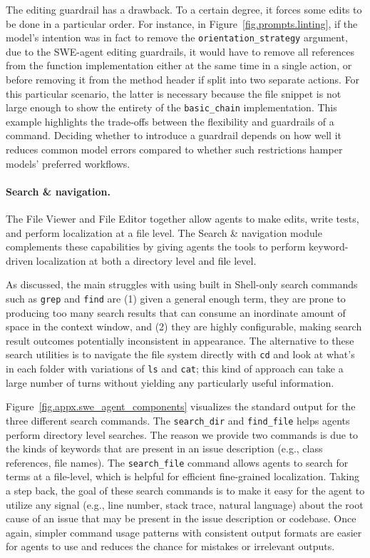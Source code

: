 The editing guardrail has a drawback.
To a certain degree, it forces some edits to be done in a particular order.
For instance, in Figure~\ref{fig.prompts.linting}, if the model's intention was in fact to remove the \texttt{orientation\_strategy} argument, due to the SWE-agent editing guardrails, it would have to remove all references from the function implementation either at the same time in a single action, or before removing it from the method header if split into two separate actions.
For this particular scenario, the latter is necessary because the file snippet is not large enough to show the entirety of the \texttt{basic\_chain} implementation.
This example highlights the trade-offs between the flexibility and guardrails of a command.
Deciding whether to introduce a guardrail depends on how well it reduces common model errors compared to whether such restrictions hamper models' preferred workflows.

\paragraph{Search \& navigation.}
The File Viewer and File Editor together allow agents to make edits, write tests, and perform localization at a file level.
The Search \& navigation module complements these capabilities by giving agents the tools to perform keyword-driven localization at both a directory level and file level.

As discussed, the main struggles with using built in Shell-only search commands such as \texttt{grep} and \texttt{find} are (1) given a general enough term, they are prone to producing too many search results that can consume an inordinate amount of space in the context window, and (2) they are highly configurable, making search result outcomes potentially inconsistent in appearance.
The alternative to these search utilities is to navigate the file system directly with \texttt{cd} and look at what's in each folder with variations of \texttt{ls} and \texttt{cat}; this kind of approach can take a large number of turns without yielding any particularly useful information.

Figure~\ref{fig.appx.swe_agent_components} visualizes the standard output for the three different search commands.
The \texttt{search\_dir} and \texttt{find\_file} helps agents perform directory level searches.
The reason we provide two commands is due to the kinds of keywords that are present in an issue description (e.g., class references, file names).
The \texttt{search\_file} command allows agents to search for terms at a file-level, which is helpful for efficient fine-grained localization.
Taking a step back, the goal of these search commands is to make it easy for the agent to utilize any signal (e.g., line number, stack trace, natural language) about the root cause of an issue that may be present in the issue description or codebase.
Once again, simpler command usage patterns with consistent output formats are easier for agents to use and reduces the chance for mistakes or irrelevant outputs.

